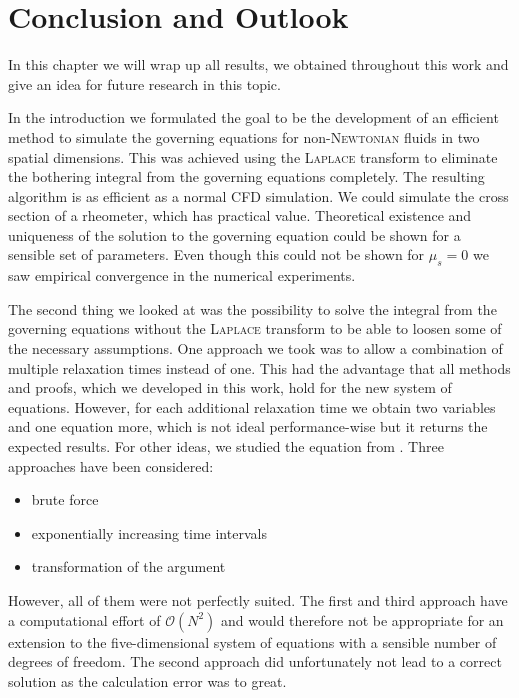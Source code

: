 \documentclass[12pt,a4paper,twoside, open=right]{scrreprt}
\theoremstyle{definition}
\theoremstyle{plain}
\begin{document}
\chapter{Conclusion and Outlook}
In this chapter we will wrap up all results, we obtained throughout this work and give an idea for future research in this topic. \par 
In the introduction we formulated the goal to be the development of an efficient method to simulate the governing equations for non-\textsc{Newtonian} fluids in two spatial dimensions. This was achieved using the \textsc{Laplace} transform to eliminate the bothering integral from the governing equations completely. The resulting algorithm is as efficient as a normal CFD simulation. We could simulate the cross section of a rheometer, which has practical value. Theoretical existence and uniqueness of the solution to the governing equation could be shown for a sensible set of parameters. Even though this could not be shown for $\mu_s=0$ we saw empirical convergence in the numerical experiments. \par 
The second thing we looked at was the possibility to solve the integral from the governing equations without the \textsc{Laplace} transform to be able to loosen some of the necessary assumptions. One approach we took was to allow a combination of multiple relaxation times instead of one. This had the advantage that all methods and proofs, which we developed in this work, hold for the new system of equations. However, for each additional relaxation time we obtain two variables and one equation more, which is not ideal performance-wise but it returns the expected results. For other ideas, we studied the equation from \cite{Gnann2012}. Three approaches have been considered:
\begin{itemize}
    \item brute force
    \item exponentially increasing time intervals
    \item transformation of the argument
\end{itemize}
However, all of them were not perfectly suited. The first and third approach have a computational effort of $\mathcal{O}(N^2)$ and would therefore not be appropriate for an extension to the five-dimensional system of equations with a sensible number of degrees of freedom. The second approach did unfortunately not lead to a correct solution as the calculation error was to great. \\
\par 
\end{document}
